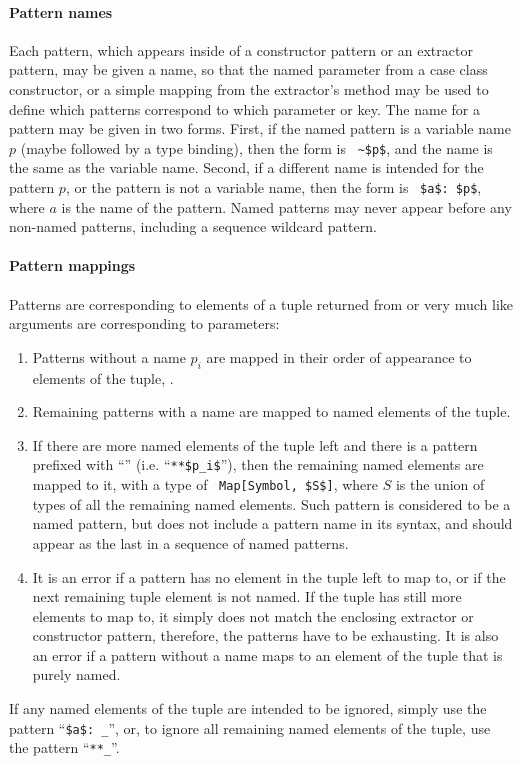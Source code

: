 \paragraph{Pattern names}
Each pattern, which appears inside of a constructor pattern or an extractor pattern, may be given a name, so that the named parameter from a case class constructor, or a simple mapping from the extractor's  method may be used to define which patterns correspond to which parameter or key. The name for a pattern may be given in two forms. First, if the named pattern is a variable name $p$ (maybe followed by a type binding), then the form is ~\lstinline!~$p$!, and the name is the same as the variable name. Second, if a different name is intended for the pattern $p$, or the pattern is not a variable name, then the form is ~\lstinline!$a$: $p$!, where $a$ is the name of the pattern. Named patterns may never appear before any non-named patterns, including a sequence wildcard pattern. 

\paragraph{Pattern mappings}
Patterns are corresponding to elements of a tuple returned from  or  very much like arguments are corresponding to parameters:
\begin{enumerate}
  \item Patterns without a name $p_i$ are mapped in their order of appearance to elements of the tuple, . 
  \item Remaining patterns with a name are mapped to named elements of the tuple. 
  \item If there are more named elements of the tuple left and there is a pattern prefixed with ``\code{**}'' (i.e. ``\lstinline!**$p_i$!''), then the remaining named elements are mapped to it, with a type of ~\lstinline!Map[Symbol, $S$]!, where $S$ is the union of types of all the remaining named elements. Such pattern is considered to be a named pattern, but does not include a pattern name in its syntax, and should appear as the last in a sequence of named patterns.
  \item It is an error if a pattern has no element in the tuple left to map to, or if the next remaining tuple element is not named. If the tuple has still more elements to map to, it simply does not match the enclosing extractor or constructor pattern, therefore, the patterns have to be exhausting. It is also an error if a pattern without a name maps to an element of the tuple that is purely named. 
\end{enumerate}
If any named elements of the tuple are intended to be ignored, simply use the pattern ``\lstinline!$a$: _!'', or, to ignore all remaining named elements of the tuple, use the pattern ``\lstinline!**_!''. 

